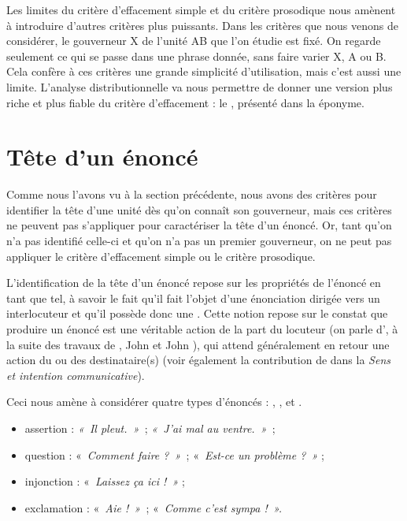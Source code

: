 Les limites du critère d’effacement simple et du critère prosodique nous amènent à introduire d’autres critères plus puissants. Dans les critères que nous venons de considérer, le gouverneur X de l’unité AB que l’on étudie est fixé. On regarde seulement ce qui se passe dans une phrase donnée, sans faire varier X, A ou B. Cela confère à ces critères une grande simplicité d’utilisation, mais c’est aussi une limite. L’analyse distributionnelle va nous permettre de donner une version plus riche et plus fiable du critère d’effacement : le , présenté dans la  éponyme.

\section{Tête d’un énoncé}\label{sec:3.3.8}

Comme nous l’avons vu à la section précédente, nous avons des critères pour identifier la tête d’une unité dès qu’on connaît son gouverneur, mais ces critères ne peuvent pas s’appliquer pour caractériser la tête d’un énoncé. Or, tant qu’on n’a pas identifié celle-ci et qu’on n’a pas un premier gouverneur, on ne peut pas appliquer le critère d’effacement simple ou le critère prosodique.

L’identification de la tête d’un énoncé repose sur les propriétés de l’énoncé en tant que tel, à savoir le fait qu’il fait l’objet d’une énonciation dirigée vers un interlocuteur et qu’il possède donc une . Cette notion repose sur le constat que produire un énoncé est une véritable action de la part du locuteur (on parle d’, à la suite des travaux de \citet{gardiner1932speech}, John \citet{austin1962how} et John \citet{searle1969speech}), qui attend généralement en retour une action du ou des destinataire(s) (voir également la contribution de \citet{bloomfield1933language} dans la  \textit{Sens et intention communicative}).

Ceci nous amène à considérer quatre types d’énoncés : , ,  et .

\begin{itemize}
\item assertion : \textit{«~Il pleut.~»~}; \textit{«~J’ai mal au ventre.~»~};
\item question : «~\textit{Comment faire ?~»~}; «~\textit{Est-ce un problème ?~»} ;
\item injonction : «~\textit{Laissez ça ici !~»} ;
\item exclamation : «~\textit{Aie !~»~}; «~\textit{Comme c’est sympa !~».}
\end{itemize}

